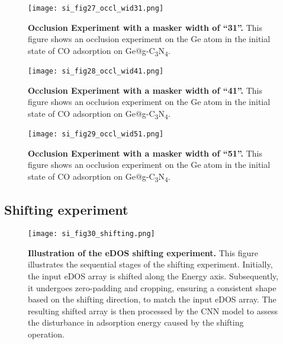 \begin{figure}
  \centering
  \texttt{[image: si\_fig27\_occl\_wid31.png]}
  \caption{\textbf{Occlusion Experiment with a masker width of “31”.}
  This figure shows an occlusion experiment on the Ge atom in
  the initial state of CO adsorption on Ge@g-C\textsubscript{3}N\textsubscript{4}.}
  \label{si_fig27:occl_wid31}
\end{figure}

\begin{figure}
  \centering
  \texttt{[image: si\_fig28\_occl\_wid41.png]}
  \caption{\textbf{Occlusion Experiment with a masker width of “41”.}
  This figure shows an occlusion experiment on the Ge atom in
  the initial state of CO adsorption on Ge@g-C\textsubscript{3}N\textsubscript{4}.}
  \label{si_fig28:occl_wid41}
\end{figure}

\begin{figure}
  \centering
  \texttt{[image: si\_fig29\_occl\_wid51.png]}
  \caption{\textbf{Occlusion Experiment with a masker width of “51”.}
  This figure shows an occlusion experiment on the Ge atom in
  the initial state of CO adsorption on Ge@g-C\textsubscript{3}N\textsubscript{4}.}
  \label{si_fig29:occl_wid51}
\end{figure}

\subsection{Shifting experiment}
\label{si_sec3.6_shifting}

\begin{figure}
  \centering
  \texttt{[image: si\_fig30\_shifting.png]}
  \caption{\textbf{Illustration of the eDOS shifting experiment.}
  This figure illustrates the sequential stages of the shifting experiment.
  Initially, the input eDOS array is shifted along the Energy axis.
  Subsequently, it undergoes zero-padding and cropping,
  ensuring a consistent shape based on the shifting direction, to match the input eDOS array.
  The resulting shifted array is then processed by the CNN model to
  assess the disturbance in adsorption energy caused by the shifting operation.}
  \label{si_fig30:shifting}
\end{figure}

